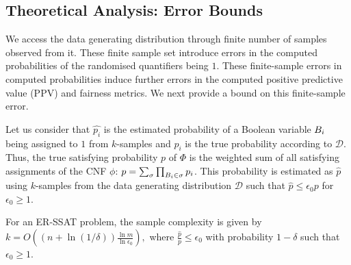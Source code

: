 \subsection{Theoretical Analysis: Error Bounds}\label{fairness_justicia_sec:theory}
We access the data generating distribution through  finite number of samples observed from it. These finite sample set introduce errors in the computed probabilities of the randomised quantifiers being $1$. These finite-sample errors in computed probabilities induce further errors in the computed positive predictive value (PPV) and fairness metrics. We next provide a bound on this finite-sample error.

Let us consider that $\hat{p_i}$ is the estimated probability of a Boolean variable $ B_i $ being assigned to $ 1 $ from $k$-samples and $p_i$ is the true probability according to $ \mathcal{D} $. 
Thus, the true satisfying probability $p$ of $ \Phi $ is the weighted sum of all satisfying assignments of the CNF $ \phi $: $p = \sum_\sigma \prod_{B_i \in \sigma}p_i$.
This probability is estimated as $\hat{p}$ using $k$-samples from the data generating distribution $\mathcal{D}$ such that $\hat{p} \leq \epsilon_0 p$ for $\epsilon_0 \geq 1$. 
\iffalse
If we consider $\epsilon_i = \frac{\ln \epsilon_0}{2^i}$, we obtain
\begin{equation*}
\begin{split}
\prod_{i =1}^m (1 \pm \epsilon_i) &\leq \left(\frac{1}{n} \sum_{i} (1 + \epsilon_i)\right)^n \\
&= (\frac{1}{n} \sum_{i} (1+\frac{\ln \epsilon_0}{2^i})^n\\
&\leq (1  +\frac{\ln \epsilon_0}{n})^n\\
&\leq e^{\ln \epsilon_0} = \epsilon_0.\notag
\end{split}
\end{equation*}
\fi
\begin{theorem}\label{fairness_justicia_thm:sample}
	For an ER-SSAT problem, the sample complexity is given by 
	$ k = O\left((n+ \ln(1/\delta))\frac{\ln m}{\ln \epsilon_0} \right),$
	where $\frac{\hat{p}}{p} \leq \epsilon_0$ with probability $1-\delta$ such that $\epsilon_0 \geq 1$.
\end{theorem}
